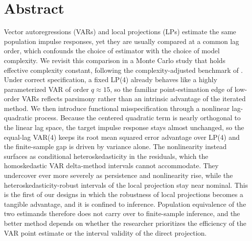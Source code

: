 
\section*{Abstract}
\thispagestyle{empty}

Vector autoregressions (VARs) and local projections (LPs) estimate the same population impulse
responses, yet they are usually compared at a common lag order, which confounds the choice of
estimator with the choice of model complexity. We revisit this comparison in a Monte Carlo study
that holds effective complexity constant, following the complexity-adjusted benchmark of
\textcite{ludwig2026local}. Under correct specification, a fixed LP(4) already behaves like a
highly parameterized VAR of order $q \approx 15$, so the familiar point-estimation edge of
low-order VARs reflects parsimony rather than an intrinsic advantage of the iterated method. We
then introduce functional misspecification through a nonlinear lag-quadratic process. Because the
centered quadratic term is nearly orthogonal to the linear lag space, the target impulse response
stays almost unchanged, so the equal-lag VAR(4) keeps its root mean squared error advantage over
LP(4) and the finite-sample gap is driven by variance alone. The nonlinearity instead surfaces as
conditional heteroskedasticity in the residuals, which the homoskedastic VAR delta-method intervals
cannot accommodate. They undercover ever more severely as persistence and nonlinearity rise, while
the heteroskedasticity-robust intervals of the local projection stay near nominal. This is the first
of our designs in which the robustness of local projections becomes a tangible advantage, and it is
confined to inference. Population equivalence of the two estimands therefore does not carry over to
finite-sample inference, and the better method depends on whether the researcher prioritizes the
efficiency of the VAR point estimate or the interval validity of the direct projection.

\clearpage
